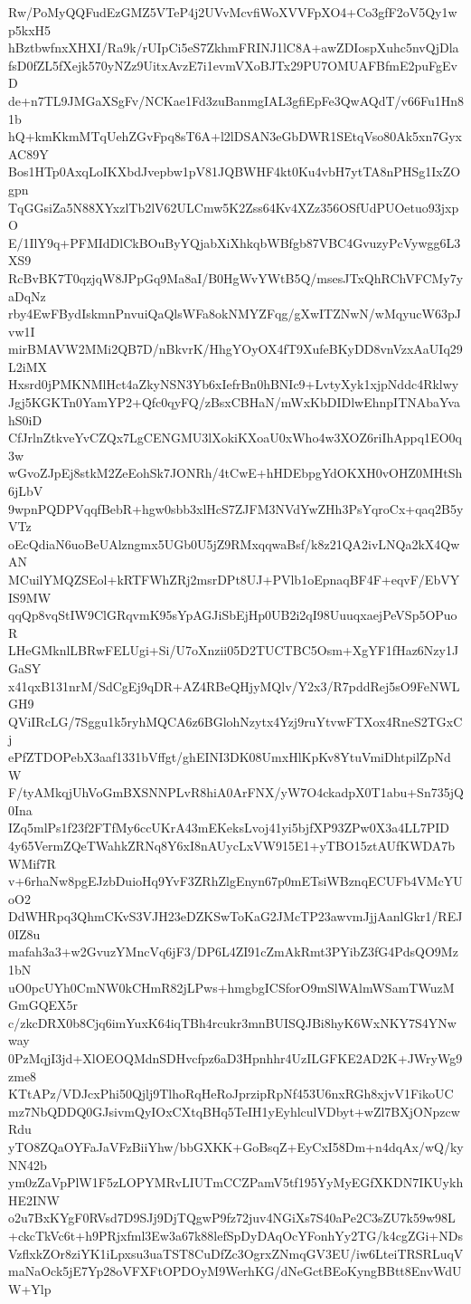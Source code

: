 Rw/PoMyQQFudEzGMZ5VTeP4j2UVvMcvfiWoXVVFpXO4+Co3gfF2oV5Qy1wp5kxH5
hBztbwfnxXHXI/Ra9k/rUIpCi5eS7ZkhmFRINJ1lC8A+awZDIospXuhc5nvQjDla
fsD0fZL5fXejk570yNZz9UitxAvzE7i1evmVXoBJTx29PU7OMUAFBfmE2puFgEvD
de+n7TL9JMGaXSgFv/NCKae1Fd3zuBanmgIAL3gfiEpFe3QwAQdT/v66Fu1Hn81b
hQ+kmKkmMTqUehZGvFpq8sT6A+l2lDSAN3eGbDWR1SEtqVso80Ak5xn7GyxAC89Y
Bos1HTp0AxqLoIKXbdJvepbw1pV81JQBWHF4kt0Ku4vbH7ytTA8nPHSg1IxZOgpn
TqGGsiZa5N88XYxzlTb2lV62ULCmw5K2Zss64Kv4XZz356OSfUdPUOetuo93jxpO
E/1IlY9q+PFMIdDlCkBOuByYQjabXiXhkqbWBfgb87VBC4GvuzyPcVywgg6L3XS9
RcBvBK7T0qzjqW8JPpGq9Ma8aI/B0HgWvYWtB5Q/msesJTxQhRChVFCMy7yaDqNz
rby4EwFBydIskmnPnvuiQaQlsWFa8okNMYZFqg/gXwITZNwN/wMqyucW63pJvw1I
mirBMAVW2MMi2QB7D/nBkvrK/HhgYOyOX4fT9XufeBKyDD8vnVzxAaUIq29L2iMX
Hxsrd0jPMKNMlHct4aZkyNSN3Yb6xIefrBn0hBNIc9+LvtyXyk1xjpNddc4Rklwy
Jgj5KGKTn0YamYP2+Qfc0qyFQ/zBsxCBHaN/mWxKbDIDlwEhnpITNAbaYvahS0iD
CfJrlnZtkveYvCZQx7LgCENGMU3lXokiKXoaU0xWho4w3XOZ6riIhAppq1EO0q3w
wGvoZJpEj8stkM2ZeEohSk7JONRh/4tCwE+hHDEbpgYdOKXH0vOHZ0MHtSh6jLbV
9wpnPQDPVqqfBebR+hgw0sbb3xlHcS7ZJFM3NVdYwZHh3PsYqroCx+qaq2B5yVTz
oEcQdiaN6uoBeUAlzngmx5UGb0U5jZ9RMxqqwaBsf/k8z21QA2ivLNQa2kX4QwAN
MCuilYMQZSEol+kRTFWhZRj2msrDPt8UJ+PVlb1oEpnaqBF4F+eqvF/EbVYIS9MW
qqQp8vqStIW9ClGRqvmK95sYpAGJiSbEjHp0UB2i2qI98UuuqxaejPeVSp5OPuoR
LHeGMknlLBRwFELUgi+Si/U7oXnzii05D2TUCTBC5Osm+XgYF1fHaz6Nzy1JGaSY
x41qxB131nrM/SdCgEj9qDR+AZ4RBeQHjyMQlv/Y2x3/R7pddRej5sO9FeNWLGH9
QViIRcLG/7Sggu1k5ryhMQCA6z6BGlohNzytx4Yzj9ruYtvwFTXox4RneS2TGxCj
ePfZTDOPebX3aaf1331bVffgt/ghEINI3DK08UmxHlKpKv8YtuVmiDhtpilZpNdW
F/tyAMkqjUhVoGmBXSNNPLvR8hiA0ArFNX/yW7O4ckadpX0T1abu+Sn735jQ0Ina
IZq5mlPs1f23f2FTfMy6ccUKrA43mEKeksLvoj41yi5bjfXP93ZPw0X3a4LL7PID
4y65VermZQeTWahkZRNq8Y6xI8nAUycLxVW915E1+yTBO15ztAUfKWDA7bWMif7R
v+6rhaNw8pgEJzbDuioHq9YvF3ZRhZlgEnyn67p0mETsiWBznqECUFb4VMcYUoO2
DdWHRpq3QhmCKvS3VJH23eDZKSwToKaG2JMcTP23awvmJjjAanlGkr1/REJ0IZ8u
mafah3a3+w2GvuzYMncVq6jF3/DP6L4ZI91cZmAkRmt3PYibZ3fG4PdsQO9Mz1bN
uO0pcUYh0CmNW0kCHmR82jLPws+hmgbgICSforO9mSlWAlmWSamTWuzMGmGQEX5r
c/zkcDRX0b8Cjq6imYuxK64iqTBh4rcukr3mnBUISQJBi8hyK6WxNKY7S4YNwway
0PzMqjI3jd+XlOEOQMdnSDHvcfpz6aD3Hpnhhr4UzILGFKE2AD2K+JWryWg9zme8
KTtAPz/VDJcxPhi50Qjlj9TlhoRqHeRoJprzipRpNf453U6nxRGh8xjvV1FikoUC
mz7NbQDDQ0GJsivmQyIOxCXtqBHq5TeIH1yEyhlculVDbyt+wZl7BXjONpzcwRdu
yTO8ZQaOYFaJaVFzBiiYhw/bbGXKK+GoBsqZ+EyCxI58Dm+n4dqAx/wQ/kyNN42b
ym0zZaVpPlW1F5zLOPYMRvLIUTmCCZPamV5tf195YyMyEGfXKDN7IKUykhHE2INW
o2u7BxKYgF0RVsd7D9SJj9DjTQgwP9fz72juv4NGiXs7S40aPe2C3sZU7k59w98L
+ckcTkVc6t+h9PRjxfml3Ew3a67k88lefSpDyDAqOcYFonhYy2TG/k4cgZGi+NDs
VzflxkZOr8ziYK1iLpxsu3uaTST8CuDfZc3OgrxZNmqGV3EU/iw6LteiTRSRLuqV
maNaOck5jE7Yp28oVFXFtOPDOyM9WerhKG/dNeGctBEoKyngBBtt8EnvWdUW+Ylp
